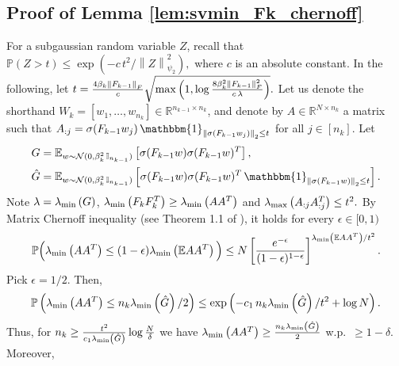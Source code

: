 \documentclass[11pt]{article}
\def\RR{\mathbb{R}}
\newcommand{\E}{\mathbb{E}}
\newcommand{\distas}[1]{\mathbin{\overset{#1}{\sim}}}
\newenvironment{proof}{\par\noindent{\bf Proof:\ }}{\hfill$\Box$\\[2mm]}
\newcommand{\Id}{\mathbb{I}}
\newcommand{\bigexp}[1]{\exp\left(#1\right)}
\newcommand{\norm}[1]{\left\|#1\right\|}
\newcommand{\evmax}[1]{\lambda_{\rm max}\left(#1\right)}
\newcommand{\evmin}[1]{\lambda_{\rm min}\left(#1\right)}
\def\MatrixChernoff{Theorem 1.1 of \cite{Tropp2011}}
\def\PP{\mathbb{P}}
\def\max{\mathop{\rm max}\nolimits}
\begin{document}
\subsection{Proof of Lemma \ref{lem:svmin_Fk_chernoff}}\label{app:lem:svmin_Fk_chernoff}
    For a subgaussian random variable $Z$, recall that $\PP(Z>t)\leq\exp(-c\, t^2 / \norm{Z}_{\psi_2}^2),$ 
    where $c$ is an absolute constant.
    In the following, let $t=\frac{4\beta_k\norm{F_{k-1}}_F}{c} \sqrt{\max\Big(1, \log\frac{8\beta_k^2\norm{F_{k-1}}_F^2}{c\,\lambda}\Big) }.$
    Let us denote the shorthand $W_k=[w_1,\ldots,w_{n_k}]\in\RR^{n_{k-1}\times n_k}$,
    and denote by $A\in\RR^{N\times n_k}$  a matrix such that
    $A_{:j}=\sigma(F_{k-1}w_j)\, \mathbbm{1}_{\norm{\sigma(F_{k-1}w_j)}_2\leq t}$ for all $j\in[n_k].$
    Let
    \begin{align*}
	&G = \E_{w\distas{}\mathcal{N} (0,\beta_k^2\,\Id_{n_{k-1}})} \left[ \sigma(F_{k-1}w)\sigma(F_{k-1}w)^T \right],\\
	&\hat{G} = \E_{w\distas{}\mathcal{N}(0,\beta_k^2\,\Id_{n_{k-1}})} \left[ \sigma(F_{k-1}w)\sigma(F_{k-1}w)^T \, \mathbbm{1}_{\norm{\sigma(F_{k-1}w)}_2\leq t} \right].
    \end{align*}
    Note $\lambda=\evmin{G}$, $\evmin{F_kF_k^T} \geq\evmin{AA^T}$ and
	$\evmax{A_{:j}A_{:j}^T} \leq t^2 .$
    By Matrix Chernoff inequality (see \MatrixChernoff), 
    it holds for every $\epsilon\in[0,1)$
    \begin{align*}
	\PP\Big( \evmin{AA^T}\leq (1-\epsilon)\evmin{\E AA^T} \Big) 
	\leq N\left[\frac{e^{-\epsilon}}{(1-\epsilon)^{1-\epsilon}}\right]^{\evmin{\E AA^T}/t^2}.
    \end{align*}
    Pick $\epsilon=1/2$. Then,
    \begin{align*}
	\PP\left( \evmin{AA^T} \leq n_k\evmin{\hat{G}}/2 \right)
	\leq \bigexp{-c_1\, n_k\evmin{\hat{G}}/t^2+\log N}.
    \end{align*}
    Thus, for $n_k\geq\frac{t^2}{c_1\evmin{\hat{G}}} \log\frac{N}{\delta}$
    we have $\evmin{AA^T}\geq \frac{n_k\evmin{\hat{G}}}{2}$ w.p.\ $\geq 1-\delta.$
    Moreover, 
\end{document}
